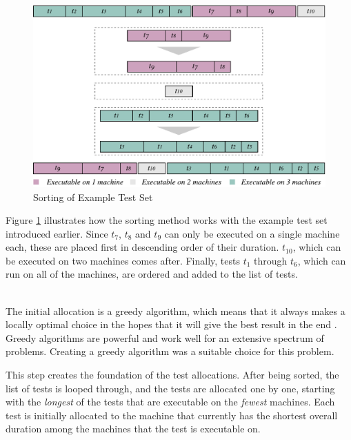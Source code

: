 \begin{figure}[ptb]
    \centering
    \includegraphics[width=\textwidth]{figures/new/sorting.pdf}
    \caption{Sorting of Example Test Set}
    \label{fig.sorted_test_suite}
\end{figure}

Figure \ref{fig.sorted_test_suite} illustrates how the sorting method works with the example test set introduced earlier. Since $t_{7}$, $t_{8}$ and $t_{9}$ can only be executed on a single machine each, these are placed first in descending order of their duration. $t_{10}$, which can be executed on two machines comes after. Finally, tests $t_{1}$ through $t_{6}$, which can run on all of the machines, are ordered and added to the list of tests.






\vspace{7px}
\noindent \textbf{}\\
\noindent The initial allocation is a greedy algorithm, which means that it always makes a locally optimal choice in the hopes that it will give the best result in the end \cite{Algorithms}. Greedy algorithms are powerful and work well for an extensive spectrum of problems. Creating a greedy algorithm was a suitable choice for this problem.

This step creates the foundation of the test allocations. After being sorted, the list of tests is looped through, and the tests are allocated one by one, starting with the \emph{longest} of the tests that are executable on the \emph{fewest} machines. Each test is initially allocated to the machine that currently has the shortest overall duration among the machines that the test is executable on.

